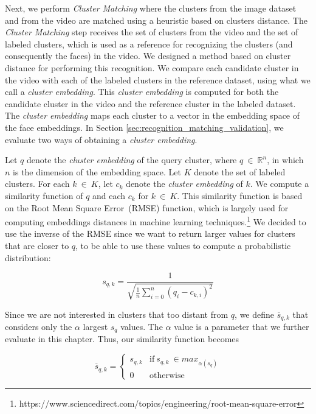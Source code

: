 Next, we perform \emph{Cluster Matching} where the clusters from the image dataset and from the video are matched using a heuristic based on clusters distance.
The \textit{Cluster Matching} step receives the set of clusters from the video and the set of labeled clusters, which is used as a reference for recognizing the clusters (and consequently the faces) in the video.
We designed a method based on cluster distance for performing this recognition.
We compare each candidate cluster in the video with each of the labeled clusters in the reference dataset, using what we call a \emph{cluster embedding}. This \emph{cluster embedding} is computed for both the candidate cluster in the video and the reference cluster in the labeled dataset.
The \emph{cluster embedding} maps each cluster to a vector in the embedding space of the face embeddings.
In Section \ref{sec:recognition_matching_validation}, we evaluate two ways of obtaining a \emph{cluster embedding}.

Let $q$ denote the \emph{cluster embedding} of the query cluster, where $q~\in~\mathbb{R}^{n}$, in which $n$ is the dimension of the embedding space.
Let $K$ denote the set of labeled clusters. For each $k~\in~K$, let $c_k$ denote the \emph{cluster embedding} of $k$. 
We compute a similarity function of $q$ and each $c_k$ for $k~\in~K$. 
This similarity function is based on the Root Mean Square Error~(RMSE) function, which is largely used for computing embeddings distances in machine learning techniques.\footnote{https://www.sciencedirect.com/topics/engineering/root-mean-square-error}
We decided to use the inverse of the RMSE since we want to return larger values for clusters that are closer to $q$, to be able to use these values to compute a probabilistic distribution:

\begin{equation}
\label{equation:similarity_raw}
    s_{q,k} = \frac{1}{\sqrt{\frac{1}{n}\sum_{i=0}^{n}{(q_i-c_{k,i})^2}}}
\end{equation}

Since we are not interested in clusters that too distant from $q$, we define $\overline{s}_{q,k}$ that considers only the $\alpha$ largest $s_q$ values. The $\alpha$ value is a parameter that we further evaluate in this chapter. 
Thus, our similarity function becomes

\begin{equation}
\label{equation:similarity}
    \overline{s}_{q,k} = \begin{cases}s_{q,k} & \text{if}~s_{q,k}~\in max_{\alpha(s_q)}\\0 & \text{otherwise}\end{cases}
\end{equation}

